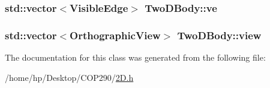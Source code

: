 \subsubsection[{\texorpdfstring{ve}{ve}}]{\setlength{\rightskip}{0pt plus 5cm}std\+::vector$<${\bf Visible\+Edge}$>$ Two\+D\+Body\+::ve}\hypertarget{class_two_d_body_ac7b38febf4667a16f07ff25b35bd818d}{}\label{class_two_d_body_ac7b38febf4667a16f07ff25b35bd818d}
\subsubsection[{\texorpdfstring{view}{view}}]{\setlength{\rightskip}{0pt plus 5cm}std\+::vector$<${\bf Orthographic\+View}$>$ Two\+D\+Body\+::view}\hypertarget{class_two_d_body_ab3fca58e4b377854805f3149c5e1a96e}{}\label{class_two_d_body_ab3fca58e4b377854805f3149c5e1a96e}


The documentation for this class was generated from the following file\+:\begin{DoxyCompactItemize}
\item 
/home/hp/\+Desktop/\+C\+O\+P290/\hyperlink{2_d_8h}{2\+D.\+h}\end{DoxyCompactItemize}

